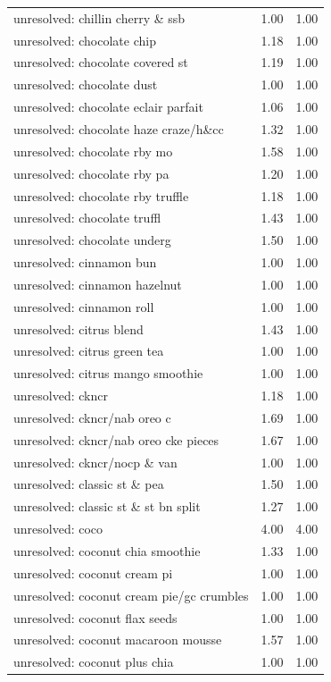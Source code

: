 \begin{table}
\begin{tabular}{lrr}
unresolved: chillin cherry \& ssb & 1.00 & 1.00 \\
unresolved: chocolate chip & 1.18 & 1.00 \\
unresolved: chocolate covered st & 1.19 & 1.00 \\
unresolved: chocolate dust & 1.00 & 1.00 \\
unresolved: chocolate eclair parfait & 1.06 & 1.00 \\
unresolved: chocolate haze craze/h\&cc & 1.32 & 1.00 \\
unresolved: chocolate rby mo & 1.58 & 1.00 \\
unresolved: chocolate rby pa & 1.20 & 1.00 \\
unresolved: chocolate rby truffle & 1.18 & 1.00 \\
unresolved: chocolate truffl & 1.43 & 1.00 \\
unresolved: chocolate underg & 1.50 & 1.00 \\
unresolved: cinnamon bun & 1.00 & 1.00 \\
unresolved: cinnamon hazelnut & 1.00 & 1.00 \\
unresolved: cinnamon roll & 1.00 & 1.00 \\
unresolved: citrus blend & 1.43 & 1.00 \\
unresolved: citrus green tea & 1.00 & 1.00 \\
unresolved: citrus mango smoothie & 1.00 & 1.00 \\
unresolved: ckncr & 1.18 & 1.00 \\
unresolved: ckncr/nab oreo c & 1.69 & 1.00 \\
unresolved: ckncr/nab oreo cke pieces & 1.67 & 1.00 \\
unresolved: ckncr/nocp \& van & 1.00 & 1.00 \\
unresolved: classic st \& pea & 1.50 & 1.00 \\
unresolved: classic st \& st bn split & 1.27 & 1.00 \\
unresolved: coco & 4.00 & 4.00 \\
unresolved: coconut chia smoothie & 1.33 & 1.00 \\
unresolved: coconut cream pi & 1.00 & 1.00 \\
unresolved: coconut cream pie/gc crumbles & 1.00 & 1.00 \\
unresolved: coconut flax seeds & 1.00 & 1.00 \\
unresolved: coconut macaroon mousse & 1.57 & 1.00 \\
unresolved: coconut plus chia & 1.00 & 1.00 \\

\end{tabular}
\end{table}
